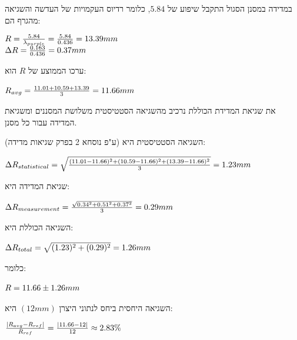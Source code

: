\documentclass[14pt]{extarticle}
\makeatletter
\newenvironment{lefteqs}{%
    \begin{english}%
    \begin{flushleft}%
    \renewcommand{\arraystretch}{1.3}%
    $\begin{array}{@{}l@{}}%
}{%
    \end{array}$%
    \end{flushleft}%
    \end{english}%
}
\makeatother
\begin{document}
במדידה במסנן הסגול התקבל שיפוע של $5.84$, כלומר רדיוס העקמויות של העדשה והשגיאה מהגרף הם:
\begin{lefteqs}
    R = \frac{5.84}{\lambda_{purple}} = \frac{5.84}{0.436} = 13.39 mm \\
    \Delta R = \frac{0.163}{0.436} = 0.37 mm
\end{lefteqs}

ערכו הממוצע של $R$ הוא:

\begin{lefteqs}
    R_{avg} = \frac{11.01 + 10.59 + 13.39}{3} = 11.66 mm
\end{lefteqs}

את שגיאת המדידת הכוללת נרכיב מהשגיאה הסטטיסטית משלושת המסננים ומשגיאת המדידה עבור כל מסנן.

השגיאה הסטטיסטית היא (ע"פ נוסחא 2 בפרק שגיאות מדידה):

\begin{lefteqs}
    \Delta R_{statistical} = \sqrt{\frac{(11.01 - 11.66)^2 + (10.59 - 11.66)^2 + (13.39 - 11.66)^2}{3}} = 1.23 mm
\end{lefteqs}

שגיאת המדידה היא:

\begin{lefteqs}
    \Delta R_{measurement} = \frac{\sqrt{0.34^2 + 0.51^2 + 0.37^2}}{3} = 0.29 mm
\end{lefteqs}

השגיאה הכוללת היא:

\begin{lefteqs}
    \Delta R_{total} = \sqrt{(1.23)^2 + (0.29)^2} = 1.26 mm
\end{lefteqs}

כלומר:

\begin{lefteqs}
    R = 11.66 \pm 1.26 mm
\end{lefteqs}

השגיאה היחסית ביחס לנתוני היצרן $(12 mm)$ היא:

\begin{lefteqs}
    \frac{|R_{avg} - R_{ref}|}{R_{ref}} = \frac{|11.66 - 12|}{12} \approx 2.83\%
\end{lefteqs}
\end{document}
